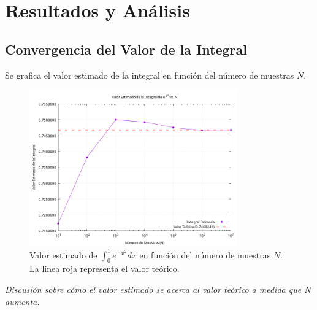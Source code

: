 \documentclass[11pt,a4paper]{article}
\begin{document}
\section{Resultados y Análisis}
\subsection{Convergencia del Valor de la Integral}
Se grafica el valor estimado de la integral en función del número de muestras $N$.
\begin{figure}[h!]
    \centering
    \includegraphics[width=0.8\textwidth]{../results/integral_mc_exp_neg_x2_valor_vs_N.png} %
    \caption{Valor estimado de $\int_0^1 e^{-x^2}dx$ en función del número de muestras $N$. La línea roja representa el valor teórico.}
    \label{fig:integral_valor}
\end{figure}
\textit{Discusión sobre cómo el valor estimado se acerca al valor teórico a medida que $N$ aumenta.}
\end{document}
